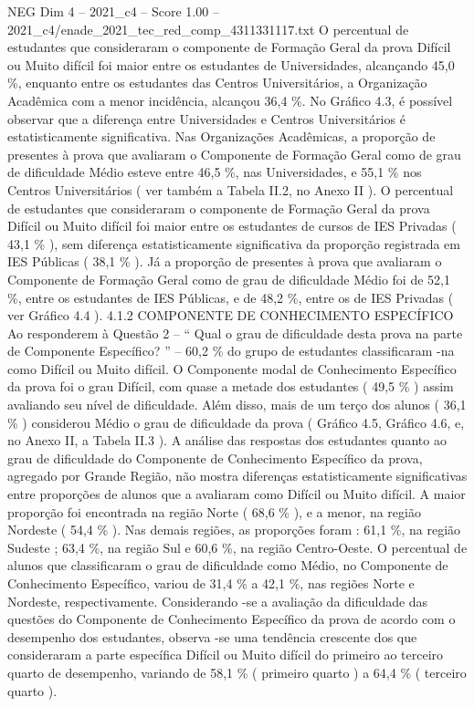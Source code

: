 \begin{textsample}{NEG Dim 4 – 2021\_c4 – Score 1.00 – 2021\_c4/enade\_2021\_tec\_red\_comp\_4311331117.txt}
O percentual de estudantes que consideraram o componente de Formação Geral da prova Difícil ou Muito difícil foi maior entre os estudantes de Universidades, alcançando 45,0 \%, enquanto entre os estudantes das Centros Universitários, a Organização Acadêmica com a menor incidência, alcançou 36,4 \%.
No Gráfico 4.3, é possível observar que a diferença entre Universidades e Centros Universitários é estatisticamente significativa.
Nas Organizações Acadêmicas, a proporção de presentes à prova que avaliaram o Componente de Formação Geral como de grau de dificuldade Médio esteve entre 46,5 \%, nas Universidades, e 55,1 \% nos Centros Universitários ( ver também a Tabela II.2, no Anexo II ).
O percentual de estudantes que consideraram o componente de Formação Geral da prova Difícil ou Muito difícil foi maior entre os estudantes de cursos de IES Privadas ( 43,1 \% ), sem diferença estatisticamente significativa da proporção registrada em IES Públicas ( 38,1 \% ).
Já a proporção de presentes à prova que avaliaram o Componente de Formação Geral como de grau de dificuldade Médio foi de 52,1 \%, entre os estudantes de IES Públicas, e de 48,2 \%, entre os de IES Privadas ( ver Gráfico 4.4 ). 4.1.2 COMPONENTE DE CONHECIMENTO ESPECÍFICO Ao responderem à Questão 2 – “ Qual o grau de dificuldade desta prova na parte de Componente Específico? ” – 60,2 \% do grupo de estudantes classificaram -na como Difícil ou Muito difícil.
O Componente modal de Conhecimento Específico da prova foi o grau Difícil, com quase a metade dos estudantes ( 49,5 \% ) assim avaliando seu nível de dificuldade.
Além disso, mais de um terço dos alunos ( 36,1 \% ) considerou Médio o grau de dificuldade da prova ( Gráfico 4.5, Gráfico 4.6, e, no Anexo II, a Tabela II.3 ).
A análise das respostas dos estudantes quanto ao grau de dificuldade do Componente de Conhecimento Específico da prova, agregado por Grande Região, não mostra diferenças estatisticamente significativas entre proporções de alunos que a avaliaram como Difícil ou Muito difícil.
A maior proporção foi encontrada na região Norte ( 68,6 \% ), e a menor, na região Nordeste ( 54,4 \% ).
Nas demais regiões, as proporções foram : 61,1 \%, na região Sudeste ; 63,4 \%, na região Sul e 60,6 \%, na região Centro-Oeste.
O percentual de alunos que classificaram o grau de dificuldade como Médio, no Componente de Conhecimento Específico, variou de 31,4 \% a 42,1 \%, nas regiões Norte e Nordeste, respectivamente.
Considerando -se a avaliação da dificuldade das questões do Componente de Conhecimento Específico da prova de acordo com o desempenho dos estudantes, observa -se uma tendência crescente dos que consideraram a parte específica Difícil ou Muito difícil do primeiro ao terceiro quarto de desempenho, variando de 58,1 \% ( primeiro quarto ) a 64,4 \% ( terceiro quarto ).

\end{textsample}
